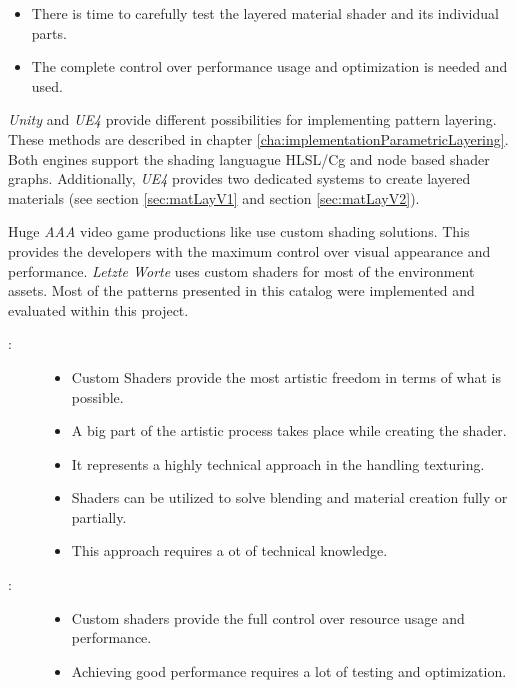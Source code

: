 \begin{description}
\begin{itemize}
		\item There is time to carefully test the layered material shader and its individual parts. 
		\item The complete control over performance usage and optimization is needed and used. 
	\end{itemize}
	\item[\patImplementation:]%
	\emph{Unity} and \emph{UE4} provide different possibilities for implementing pattern layering. These methods are described in chapter \ref{cha:implementationParametricLayering}. Both engines support the shading languague HLSL/Cg and node based shader graphs. Additionally, \emph{UE4} provides two dedicated systems to create layered materials (see section \ref{sec:matLayV1} and section \ref{sec:matLayV2}).
	\item[\patExamples]%
	Huge \emph{AAA} video game productions like \cite{witcher2015cdproject, order2015readyatdawns, naugthy2016uncharted, paragon2016epic, gears2016coalition}%
	use custom shading solutions. This provides the developers with the maximum control over visual appearance and performance. \emph{Letzte Worte} uses custom shaders for most of the environment assets. Most of the patterns presented in this catalog were implemented and evaluated within this project.
	\item[\patConsequences:]\hfill 
		\begin{description}
			\item[\visual:]\hfill
			\begin{itemize}\mynobreakpar
				\item Custom Shaders provide the most artistic freedom in terms of what is possible.
				\item A big part of the artistic process takes place while creating the shader. 
				\item It represents a highly technical approach in the handling texturing. 
				\item Shaders can be utilized to solve blending and material creation fully or partially. 
				\item This approach requires a ot of technical knowledge.  
			\end{itemize}
			\item[\performance:]\hfill
			\begin{itemize}\mynobreakpar
				\item Custom shaders provide the full control over resource usage and performance. 
				\item Achieving good performance requires a lot of testing and optimization.

\end{itemize}
\end{description}
\end{description}
